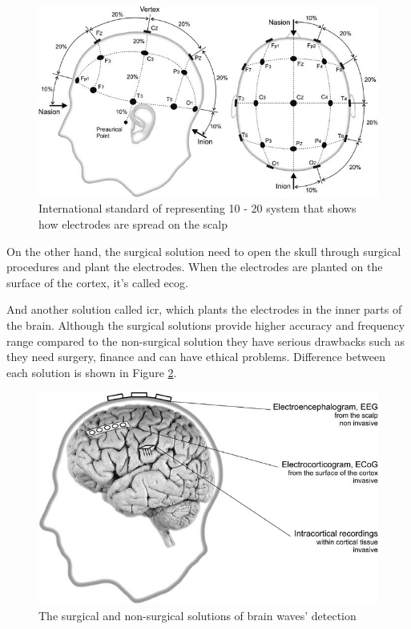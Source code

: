 \begin{figure}
    \centering
    \includegraphics[width=\figureWidth]{images/background/10_20_system.jpg}
    \caption{International standard of representing 10 - 20 system that shows how electrodes are spread on the scalp \cite{inbook1}}
    \label{fig:10-20-system}
\end{figure}
On the other hand, the surgical solution need to open the skull through surgical procedures and plant the electrodes. When the electrodes are planted on the surface of the cortex, it’s called \ac{ecog}.\par
And another solution called \ac{icr}, which plants the electrodes in the inner parts of the brain. Although the surgical solutions provide higher accuracy and frequency range compared to the non-surgical solution they have serious drawbacks such as they need surgery, finance and can have ethical problems. Difference between each solution is shown in Figure \ref{fig:brain-waves-detection}.\par
\begin{figure}
    \centering
    \includegraphics[width=\figureWidth]{images/background/brain-waves-detection.jpg}
    \caption{The surgical and non-surgical solutions of brain waves' detection \cite{inbook1}}
    \label{fig:brain-waves-detection}
\end{figure}
